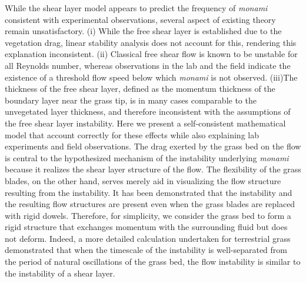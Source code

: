 \documentclass[aps,prl,twocolumn,superscriptaddress,10pt]{revtex4-1}  %
\newcommand{\monami}{\textit{monami }}
\begin{document}
While the shear layer model appears to predict the frequency of \monami consistent with experimental observations, several aspect of existing theory remain unsatisfactory. 
(i) While the free shear layer is established due to the vegetation drag, linear stability analysis\cite{Raupach96} does not account for this, rendering this explanation inconsistent. 
(ii) Classical free shear flow is known to be unstable for all Reynolds number\cite{drazin}, whereas observations in the lab\cite{Ghisal02} and the field\cite{Grizzle96} indicate the existence of a threshold 
flow speed below which \monami is not observed. 
(iii)The thickness of the free shear layer, defined as the momentum thickness of the boundary layer near the grass tip, is in many cases comparable to the unvegetated layer thickness,
and therefore inconsistent with the assumptions of the free shear layer instability.
Here we present a self-consistent mathematical model that account correctly for these effects 
while also explaining lab experiments and field observations.
\newline
The drag exerted by the grass bed on the flow is central to the hypothesized mechanism\cite{Ghisal02} of the instability underlying \monami because it realizes the shear layer structure of the flow. 
The flexibility of the grass blades, on the other hand, serves merely aid in visualizing the flow structure resulting from the instability\cite{Nepf2012}. 
It has been demonstrated that the instability and the resulting flow structures are present even when the grass blades are replaced with rigid dowels\cite{Ghisal02}. 
Therefore, for simplicity, we consider the grass bed to form a rigid structure that exchanges momentum with the surrounding fluid but does not deform. 
Indeed, a more detailed calculation undertaken for terrestrial grass demonstrated\cite{Delangre06} that when the timescale of the instability is well-separated from the period of natural oscillations of the grass bed, 
the flow instability is similar to the instability of a shear layer. 
\end{document}
